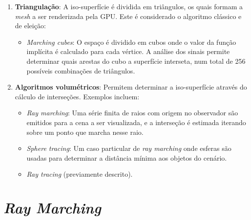 \begin{enumerate}
	\item \textbf{Triangulação}: A iso-superfície é dividida em triângulos, os quais formam a \textit{mesh} a ser renderizada pela \ac{GPU}. Este é considerado o algoritmo clássico e de eleição:
	\begin{itemize}[nosep]
		\item \textit{Marching cubes}\cite{Lorensen1987}: O espaço é dividido em cubos onde o valor da função implícita é calculado para cada vértice. A análise dos sinais permite determinar quais arestas do cubo a superfície interseta, num total de 256 possíveis combinações de triângulos.
	\end{itemize}
	
	\item \textbf{Algoritmos volumétricos}: Permitem determinar a iso-superfície através do cálculo de interseções. Exemplos incluem:
	\begin{itemize}
		\item \textit{Ray marching}: Uma série finita de raios com origem no observador são emitidos para a cena a ser visualizada, e a interseção é estimada iterando sobre um ponto que marcha nesse raio.
		\item \textit{Sphere tracing}\cite{Hart1996}: Um caso particular de \textit{ray marching} onde esferas são usadas para determinar a distância mínima aos objetos do cenário.
		\item \textit{Ray tracing} (previamente descrito).
	\end{itemize}
\end{enumerate}



\section{\emph{Ray Marching}}
\label{sec::arte:raymarch}


